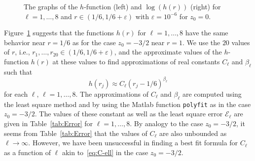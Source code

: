 \begin{figure}[htb] %
	\centerline{
		\hfill
	}
	\caption{The graphs of the $h$-function (left) and  $\log(h(r))$ (right) for $\ell=1,\ldots,8$ and $r\in(1/6,1/6+\varepsilon)$ with $\varepsilon=10^{-6}$ for $z_0=0$.}
	\label{fig:h0-asy}
\end{figure}

Figure~\ref{fig:h0-asy} suggests that the functions $h(r)$ for $\ell=1,\ldots,8$ have the same behavior near $r=1/6$ as for the case $z_0=-3/2$ near $r=1$.
We use the $20$ values of $r$, i.e., $r_1,\ldots,r_{20}\in(1/6,1/6+\varepsilon)$, and the approximate values of the $h$-function $h(r)$ at these values to find approximations of real constants $C_\ell$ and $\beta_\ell$ such that
\begin{equation}\label{eq:hrj-C0}
	h(r_j)\approx C_\ell (r_j-1/6)^{\beta_\ell}
\end{equation}
for each $\ell$, $\ell=1,\ldots,8$.
The approximations of $C_\ell$ and $\beta_\ell$ are computed using the least square method and by using the {\sc Matlab} function \verb|polyfit| as in the case $z_0=-3/2$. The values of these constant as well as the least square error $\mathcal{E}_\ell$ are given in Table~\ref{tab:Error} for $\ell=1,\ldots,8$. By analogy to the case $z_0=-3/2$, it seems from Table~\ref{tab:Error} that the values of $C_\ell$ are also unbounded as $\ell\to\infty$. However, we have been unsuccessful in finding a best fit formula for $C_\ell$ as a function of $\ell$ akin to~\eqref{eq:C-ell} in the case $z_0=-3/2$. 



